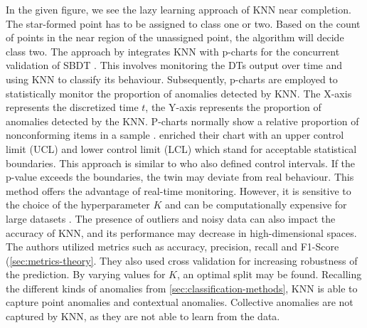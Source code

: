 In the given figure, we see the lazy learning approach of KNN near completion. The star-formed point has to be assigned to class one or two. Based on the count of points in the near region of the unassigned point, the algorithm will decide class two.
The approach by \autocite{dos2024simulation} integrates KNN with p-charts for the concurrent validation of SBDT \autocite{dos2024digital}. This involves monitoring the DTs output over time and using KNN to classify its behaviour. Subsequently, p-charts are employed to statistically monitor the proportion of anomalies detected by KNN. The X-axis represents the discretized time $t$, the Y-axis represents the proportion of anomalies detected by the KNN. P-charts normally show a relative proportion of nonconforming items in a sample \autocite{acosta1999improved}. \Autocite{dos2024simulation} enriched their chart with an upper control limit (UCL) and lower control limit (LCL) which stand for acceptable statistical boundaries. This approach is similar to \autocite{Nie2023rcim} who also defined control intervals. If the p-value exceeds the boundaries, the twin may deviate from real behaviour. This method offers the advantage of real-time monitoring. However, it is sensitive to the choice of the hyperparameter $K$ and can be computationally expensive for large datasets \autocite{dos2024simulation}. The presence of outliers and noisy data can also impact the accuracy of KNN, and its performance may decrease in high-dimensional spaces. The authors utilized metrics such as accuracy, precision, recall and F1-Score (\autoref{sec:metrics-theory}. They also used cross validation for increasing robustness of the prediction. By varying values for $K$, an optimal split may be found. Recalling the different kinds of anomalies from \autoref{sec:classification-methods}, KNN is able to capture point anomalies and contextual anomalies. Collective anomalies are not captured by KNN, as they are not able to learn from the data.
